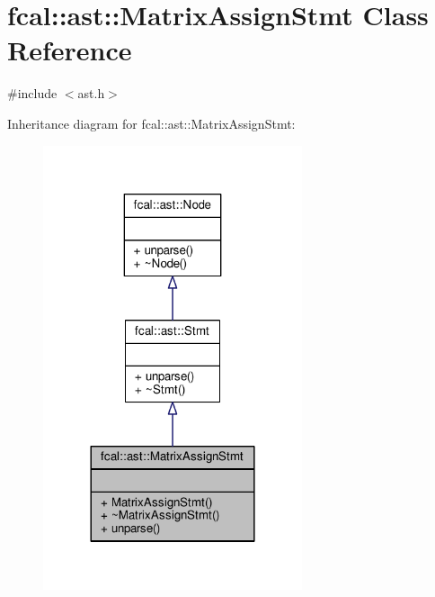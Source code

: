 \hypertarget{classfcal_1_1ast_1_1MatrixAssignStmt}{}\section{fcal\+:\+:ast\+:\+:Matrix\+Assign\+Stmt Class Reference}
\label{classfcal_1_1ast_1_1MatrixAssignStmt}


{\ttfamily \#include $<$ast.\+h$>$}



Inheritance diagram for fcal\+:\+:ast\+:\+:Matrix\+Assign\+Stmt\+:
\nopagebreak
\begin{figure}[H]
\begin{center}
\leavevmode
\includegraphics[width=216pt]{classfcal_1_1ast_1_1MatrixAssignStmt__inherit__graph}
\end{center}
\end{figure}


